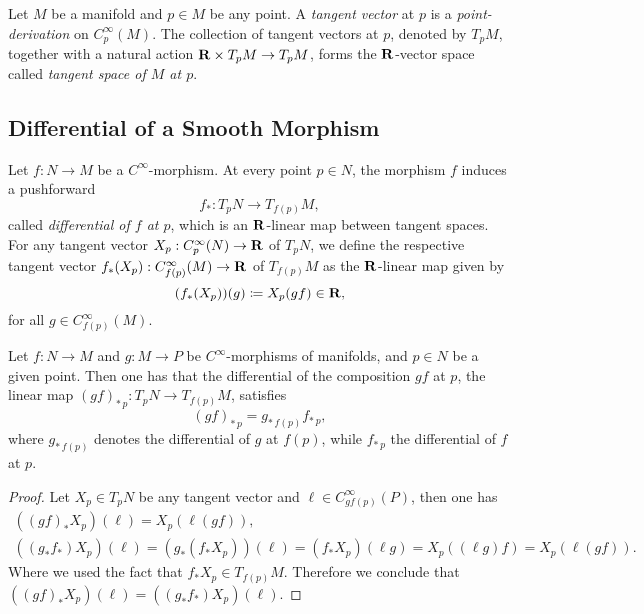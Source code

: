 \begin{definition}
\label{def:tangent-vector-at-point-manifold}
Let \(M\) be a manifold and \(p \in M\) be any point. A \emph{tangent vector} at
\(p\) is a \emph{point-derivation} on \(C_p^{\infty}(M)\). The collection of
tangent vectors at \(p\), denoted by \(T_p M\), together with a natural action
\(\mathbf{R} \times T_p M \to T_p M\), forms the \(\mathbf{R}\)-vector space called
\emph{tangent space of \(M\) at \(p\)}.
\end{definition}

\subsection{Differential of a Smooth Morphism}

\begin{definition}
\label{def:differential-at-a-point}
Let \(f: N \to M\) be a \(C^{\infty}\)-morphism. At every point \(p \in N\), the
morphism \(f\) induces a pushforward
\[
f_{*}: T_p N \longrightarrow T_{f(p)} M,
\]
called \emph{differential of \(f\) at \(p\)}, which is an \(\mathbf{R}\)-linear map
between tangent spaces. For any tangent vector \(X_p: C_p^{\infty}(N) \to \mathbf{R}\) of
\(T_p N\), we define the respective tangent vector
\(f_{*}(X_p): C_{f(p)}^{\infty}(M) \to \mathbf{R}\) of \(T_{f(p)} M\) as the
\(\mathbf{R}\)-linear map given by
\[
(f_{*}(X_p))(g) \coloneq X_p(g f) \in \mathbf{R},
\]
for all \(g \in C_{f(p)}^{\infty}(M)\).
\end{definition}

\begin{proposition}
\label{prop:chain-rule}
Let \(f: N \to M\) and \(g: M \to P\) be \(C^{\infty}\)-morphisms of manifolds,
and \(p \in N\) be a given point. Then one has that the differential of the
composition \(g f\) at \(p\), the linear map
\((g f)_{*\, p}: T_pN \to T_{f(p)}M\), satisfies
\[
(g f)_{*\, p} = g_{*\, f(p)} f_{*\, p} ,
\]
where \(g_{*\, f(p)}\) denotes the differential of \(g\) at \(f(p)\), while
\(f_{*\, p}\) the differential of \(f\) at \(p\).
\end{proposition}

\begin{proof}
Let \(X_p \in T_p N\) be any tangent vector and
\(\ell \in C_{g f(p)}^{\infty}(P)\), then one has
\begin{gather*}
((g f)_{*} X_p)(\ell) = X_p(\ell (g f)),
\\
((g_{*} f_{*})X_p)(\ell)
= (g_{*}(f_{*} X_p))(\ell)
= (f_* X_p)(\ell g)
= X_p ((\ell g) f)
= X_p (\ell (g f)).
\end{gather*}
Where we used the fact that \(f_{*} X_p \in T_{f(p)} M\). Therefore we conclude
that \(((g f)_{*} X_p)(\ell) = ((g_{*} f_{*}) X_p)(\ell)\).
\end{proof}

